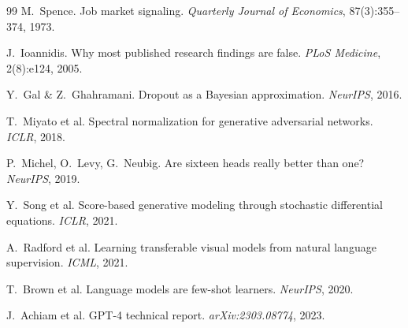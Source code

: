 \documentclass[12pt,a4paper]{article}
\theoremstyle{definition}
\begin{document}
\begin{thebibliography}{99}
 M.~Spence. Job market signaling. \textit{Quarterly Journal of Economics}, 87(3):355--374, 1973.

 J.~Ioannidis. Why most published research findings are false. \textit{PLoS Medicine}, 2(8):e124, 2005.

 Y.~Gal \& Z.~Ghahramani. Dropout as a Bayesian approximation. \textit{NeurIPS}, 2016.

 T.~Miyato et al. Spectral normalization for generative adversarial networks. \textit{ICLR}, 2018.

 P.~Michel, O.~Levy, G.~Neubig. Are sixteen heads really better than one? \textit{NeurIPS}, 2019.

 Y.~Song et al. Score-based generative modeling through stochastic differential equations. \textit{ICLR}, 2021.

 A.~Radford et al. Learning transferable visual models from natural language supervision. \textit{ICML}, 2021.

 T.~Brown et al. Language models are few-shot learners. \textit{NeurIPS}, 2020.

 J.~Achiam et al. GPT-4 technical report. \textit{arXiv:2303.08774}, 2023.

\end{thebibliography}
\end{document}
